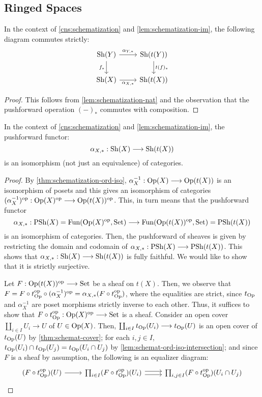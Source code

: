 
\subsection{Ringed Spaces}

\begin{cor}\label{cor:pushfrwrd-schemat-nat}
In the context of \cref{cns:schematization} and \cref{lem:schematization-im},
the following diagram commutes strictly:
\[\begin{tikzcd}
\Sh(Y) \ar[r, "\alpha_{Y, *}"] \ar[d, "f_*" left] &
\Sh(t(Y)) \ar[d, "t(f)_*"] \\
\Sh(X) \ar[r, "\alpha_{X, *}" below] & \Sh(t(X))
\end{tikzcd}\]
\end{cor}
\begin{proof}
This follows from \cref{lem:schematization-nat} and the observation
that the pushforward operation $(-)_*$ commutes with composition.
\end{proof}

\begin{thm}\label{thm:alpha-pushfwd-iso}
In the context of \cref{cns:schematization} and \cref{lem:schematization-im},
the pushforward functor:
\[
\alpha_{X, *} : \Sh(X) \to \Sh(t(X))
\]
is an isomorphism (not just an equivalence) of categories.
\end{thm}
\begin{proof}
By \cref{thm:schematization-ord-iso}, $\alpha_X^{-1} : \Op(X) \to \Op(t(X))$
is an isomorphism of posets and this gives an isomorphism of categories
$(\alpha_X^{-1})^\op : \Op(X)^\op \to \Op(t(X))^\op$. This, in turn
means that the pushforward functor
\[
\alpha_{X, *} : \PSh(X) = \Fun(\Op(X)^\op, \Set)
\to \Fun(\Op(t(X))^\op, \Set) = \PSh(t(X))
\]
is an isomorphism of categories. Then, the pushforward of sheaves is given
by restricting the domain and codomain of
$\alpha_{X, *} : \PSh(X) \to \PSh(t(X))$. This shows that
$\alpha_{X, *} : \Sh(X) \to \Sh(t(X))$ is fully faithful.
We would like to show that it is strictly surjective.

Let $F : \Op(t(X))^\op \to \Set$ be a sheaf on $t(X)$.
Then, we observe that $F = F \circ t_{\mathrm{Op}}^{\mathrm{op}} \circ (\alpha_X^{-1})^{\mathrm{op}}
= \alpha_{X, *}(F \circ t_{\mathrm{Op}}^{\mathrm{op}})$, where the equalities are strict, since
$t_{\mathrm{Op}}$ and $\alpha_X^{-1}$ are poset morphisms strictly inverse to each other.
Thus, it suffices to show that
$F \circ t_\Op^\op : \Op(X)^\op \to \Set$ is a sheaf.
Consider an open cover $\coprod_{i \in I} U_i \to U$ of $U \in \mathrm{Op}(X)$.
Then, $\coprod_{i \in I} t_\Op(U_i) \to t_\Op(U)$ is an open cover
of $t_{\mathrm{Op}}(U)$ by \cref{thm:schemat-cover}; for each $i, j \in I$,
$t_{\mathrm{Op}}(U_i) \cap t_{\mathrm{Op}}(U_j) = t_{\mathrm{Op}}(U_i \cap U_j)$ by
\cref{lem:schemat-ord-iso-intersection};
and since $F$ is a sheaf by assumption, the following
is an equalizer diagram:
\[\begin{tikzcd}
(F \circ t_\Op^\op)(U) \ar[r] &
\prod_{i \in I} (F \circ t_\Op^\op)(U_i)
    \ar[r, shift left] \ar[r, shift right] &
\prod_{i, j \in I} (F \circ t_\Op^\op)(U_i \cap U_j)
\end{tikzcd}\]
\end{proof}

